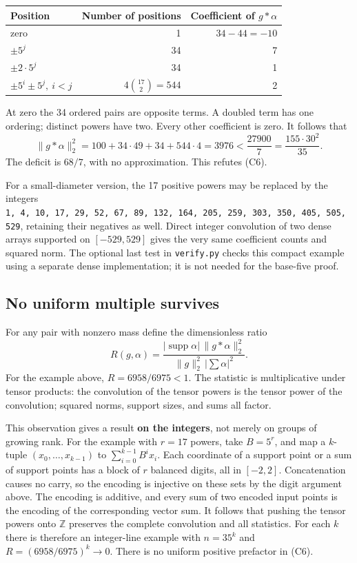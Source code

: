 \documentclass[11pt]{article}
\begin{document}
\begin{longtable}[]{@{}lrr@{}}
\toprule\noalign{}
Position & Number of positions & Coefficient of \(g*\alpha\) \\
\midrule\noalign{}
\endhead
\bottomrule\noalign{}
\endlastfoot
zero & 1 & \(34-44=-10\) \\
\(\pm5^j\) & 34 & 7 \\
\(\pm2\cdot5^j\) & 34 & 1 \\
\(\pm5^i\pm5^j,\ i<j\) & \(4\binom{17}{2}=544\) & 2 \\
\end{longtable}

At zero the 34 ordered pairs are opposite terms. A doubled term has one ordering; distinct powers have two. Every other coefficient is zero. It follows that \[
 \|g*\alpha\|_2^2=100+34\cdot49+34+544\cdot4
 =3976<\frac{27900}{7}=\frac{155\cdot30^2}{35}.
\] The deficit is \(68/7\), with no approximation. This refutes (C6).

For a small-diameter version, the 17 positive powers may be replaced by the integers \texttt{1,\ 4,\ 10,\ 17,\ 29,\ 52,\ 67,\ 89,\ 132,\ 164,\ 205,\ 259,\ 303,\ 350,\ 405,\ 505,\ 529}, retaining their negatives as well. Direct integer convolution of two dense arrays supported on \([-529,529]\) gives the very same coefficient counts and squared norm. The optional last test in \texttt{verify.py} checks this compact example using a separate dense implementation; it is not needed for the base-five proof.

\subsection{No uniform multiple survives}\label{no-uniform-multiple-survives}

For any pair with nonzero mass define the dimensionless ratio \[
 R(g,\alpha)=\frac{|\operatorname{supp}\alpha|\,\|g*\alpha\|_2^2}
 {\|g\|_2^2\,|\sum\alpha|^2}.
\] For the example above, \(R=6958/6975<1\). The statistic is multiplicative under tensor products: the convolution of the tensor powers is the tensor power of the convolution; squared norms, support sizes, and sums all factor.

This observation gives a result \textbf{on the integers}, not merely on groups of growing rank. For the example with \(r=17\) powers, take \(B=5^r\), and map a \(k\)-tuple \((x_0,\ldots,x_{k-1})\) to \(\sum_{i=0}^{k-1}B^ix_i\). Each coordinate of a support point or a sum of support points has a block of \(r\) balanced digits, all in \([-2,2]\). Concatenation causes no carry, so the encoding is injective on these sets by the digit argument above. The encoding is additive, and every sum of two encoded input points is the encoding of the corresponding vector sum. It follows that pushing the tensor powers onto \(\mathbb Z\) preserves the complete convolution and all statistics. For each \(k\) there is therefore an integer-line example with \(n=35^k\) and \(R=(6958/6975)^k\to0\). There is no uniform positive prefactor in (C6).
\end{document}
